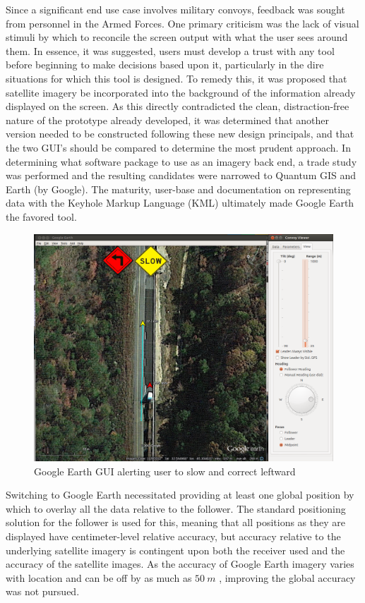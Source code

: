 \documentclass[twocolumn,10pt]{article}
\begin{document}
    Since a significant end use case involves military convoys, feedback was sought from personnel in the Armed Forces.  One primary criticism was the lack of visual stimuli by which to reconcile the screen output with what the user sees around them.  In essence, it was suggested, users must develop a trust with any tool before beginning to make decisions based upon it, particularly in the dire situations for which this tool is designed.  To remedy this, it was proposed that satellite imagery be incorporated into the background of the information already displayed on the screen.  As this directly contradicted the clean, distraction-free nature of the prototype already developed, it was determined that another version needed to be constructed following these new design principals, and that the two GUI's should be compared to determine the most prudent approach.  In determining what software package to use as an imagery back end, a trade study was performed and the resulting candidates were narrowed to Quantum GIS and Earth (by Google).  The maturity, user-base and documentation on representing data with the Keyhole Markup Language (KML) ultimately made Google Earth the favored tool.

    \begin{figure}[ht] \centering
      \includegraphics[width=\columnwidth] {../graphics/earth_slow.png}
      \caption{Google Earth GUI alerting user to slow and correct leftward}
      \label{fig:earth_alerts}
    \end{figure}

    Switching to Google Earth necessitated providing at least one global position by which to overlay all the data relative to the follower.  The standard positioning solution for the follower is used for this, meaning that all positions as they are displayed have centimeter-level relative accuracy, but accuracy relative to the underlying satellite imagery is contingent upon both the receiver used and the accuracy of the satellite images.  As the accuracy of Google Earth imagery varies with location and can be off by as much as $50~m$ \cite{ge_accuracy}, improving the global accuracy was not pursued.
\end{document}
